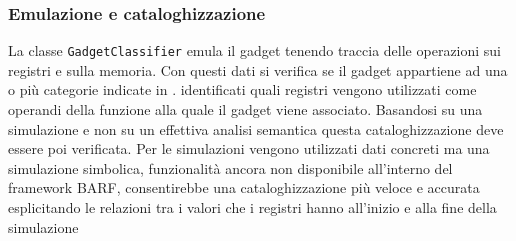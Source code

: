 \subsubsection{Emulazione e cataloghizzazione}
La classe \lstinline{GadgetClassifier} emula il gadget tenendo traccia
delle operazioni sui registri e sulla memoria. Con questi dati si
verifica se il gadget appartiene ad una o più categorie indicate in
\rif{}. %
identificati quali registri vengono utilizzati come operandi della
funzione alla quale il gadget viene associato. Basandosi su una
simulazione e non su un effettiva analisi semantica questa
cataloghizzazione deve essere poi verificata. Per le simulazioni
vengono utilizzati dati concreti ma una simulazione simbolica,
funzionalità ancora non disponibile all'interno del framework BARF,
consentirebbe una cataloghizzazione più veloce e accurata esplicitando
le relazioni tra i valori che i registri hanno all'inizio e alla fine
della simulazione

